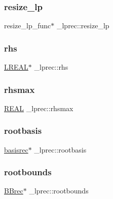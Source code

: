 \subsubsection{\texorpdfstring{resize\+\_\+lp}{resize\_lp}}
{\footnotesize\ttfamily resize\+\_\+lp\+\_\+func$\ast$ \+\_\+lprec\+::resize\+\_\+lp}

\mbox{\label{struct__lprec_aa18997894373f364902099ad87542593}} 
\subsubsection{\texorpdfstring{rhs}{rhs}}
{\footnotesize\ttfamily \hyperlink{lp__lib_8h_a6793a7216e39606f9dcb5b0227cecb64}{L\+R\+E\+AL}$\ast$ \+\_\+lprec\+::rhs}

\mbox{\label{struct__lprec_a04aa451fc2cd14346a0ae9d695974dc7}} 
\subsubsection{\texorpdfstring{rhsmax}{rhsmax}}
{\footnotesize\ttfamily \hyperlink{lp__lib_8h_a92bd5e363d131fa73669358edb232dce}{R\+E\+AL} \+\_\+lprec\+::rhsmax}

\mbox{\label{struct__lprec_a0e1b80b7456e20177ec5ee26799602a7}} 
\subsubsection{\texorpdfstring{rootbasis}{rootbasis}}
{\footnotesize\ttfamily \hyperlink{lp__lib_8h_ab12bb5784cc0de653476f989f84c8fc7}{basisrec}$\ast$ \+\_\+lprec\+::rootbasis}

\mbox{\label{struct__lprec_a668d4d967ca4e3ae0aae0ee66a8b4ffd}} 
\subsubsection{\texorpdfstring{rootbounds}{rootbounds}}
{\footnotesize\ttfamily \hyperlink{lp__mipbb_8h_ae026b9e144211c85f8761e2e85fc0446}{B\+Brec}$\ast$ \+\_\+lprec\+::rootbounds}


